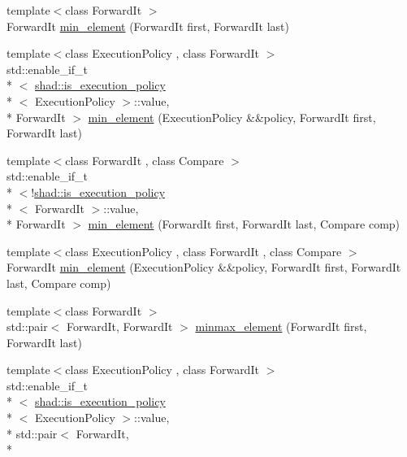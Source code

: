 \begin{DoxyCompactItemize}
\item 
{\footnotesize template$<$class Forward\-It $>$ }\\Forward\-It \hyperlink{namespaceshad_a8fa362bdd1e3f20d68a86f80cd5d47e5}{min\-\_\-element} (Forward\-It first, Forward\-It last)
\item 
{\footnotesize template$<$class Execution\-Policy , class Forward\-It $>$ }\\std\-::enable\-\_\-if\-\_\-t\\*
$<$ \hyperlink{structshad_1_1is__execution__policy}{shad\-::is\-\_\-execution\-\_\-policy}\\*
$<$ Execution\-Policy $>$\-::value, \\*
Forward\-It $>$ \hyperlink{namespaceshad_ab2b1735a5a797bce70247ebf95081238}{min\-\_\-element} (Execution\-Policy \&\&policy, Forward\-It first, Forward\-It last)
\item 
{\footnotesize template$<$class Forward\-It , class Compare $>$ }\\std\-::enable\-\_\-if\-\_\-t\\*
$<$!\hyperlink{structshad_1_1is__execution__policy}{shad\-::is\-\_\-execution\-\_\-policy}\\*
$<$ Forward\-It $>$\-::value, \\*
Forward\-It $>$ \hyperlink{namespaceshad_aaea0353fe93d75d2a5dbe4409921a25e}{min\-\_\-element} (Forward\-It first, Forward\-It last, Compare comp)
\item 
{\footnotesize template$<$class Execution\-Policy , class Forward\-It , class Compare $>$ }\\Forward\-It \hyperlink{namespaceshad_ade79004d9d2b57d94717640536689f30}{min\-\_\-element} (Execution\-Policy \&\&policy, Forward\-It first, Forward\-It last, Compare comp)
\item 
{\footnotesize template$<$class Forward\-It $>$ }\\std\-::pair$<$ Forward\-It, Forward\-It $>$ \hyperlink{namespaceshad_a04498eaaa7278dc429fcdf93f5915bfd}{minmax\-\_\-element} (Forward\-It first, Forward\-It last)
\item 
{\footnotesize template$<$class Execution\-Policy , class Forward\-It $>$ }\\std\-::enable\-\_\-if\-\_\-t\\*
$<$ \hyperlink{structshad_1_1is__execution__policy}{shad\-::is\-\_\-execution\-\_\-policy}\\*
$<$ Execution\-Policy $>$\-::value, \\*
std\-::pair$<$ Forward\-It, \\*

\end{DoxyCompactItemize}
